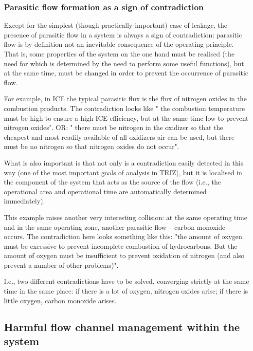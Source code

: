\documentclass[a4paper,11pt]{article}
\begin{document}
\subsubsection{Parasitic flow formation as a sign of contradiction}

Except for the simplest (though practically important) case of leakage, the
presence of parasitic flow in a system is always a sign of contradiction:
parasitic flow is by definition not an inevitable consequence of the operating
principle. That is, some properties of the system on the one hand must be
realised (the need for which is determined by the need to perform some useful
functions), but at the same time, must be changed in order to prevent the
occurrence of parasitic flow.

For example, in ICE the typical parasitic flux is the flux of nitrogen oxides
in the combustion products. The contradiction looks like " the combustion
temperature must be high to ensure a high ICE efficiency, but at the same time
low to prevent nitrogen oxides". OR: " there must be nitrogen in the oxidizer
so that the cheapest and most readily available of all oxidizers air can be
used, but there must be no nitrogen so that nitrogen oxides do not occur".

What is also important is that not only is a contradiction easily detected in
this way (one of the most important goals of analysis in TRIZ), but it is
localised in the component of the system that acts as the source of the flow
(i.e., the operational area and operational time are automatically determined
immediately).

This example raises another very interesting collision: at the same operating
time and in the same operating zone, another parasitic flow -- carbon monoxide
-- occurs. The contradiction here looks something like this: "the amount of
oxygen must be excessive to prevent incomplete combustion of hydrocarbons. But
the amount of oxygen must be insufficient to prevent oxidation of nitrogen
(and also prevent a number of other problems)".

I.e., two different contradictions have to be solved, converging strictly at
the same time in the same place: if there is a lot of oxygen, nitrogen oxides
arise; if there is little oxygen, carbon monoxide arises.

\subsection{Harmful flow channel management within the system}
\end{document}
